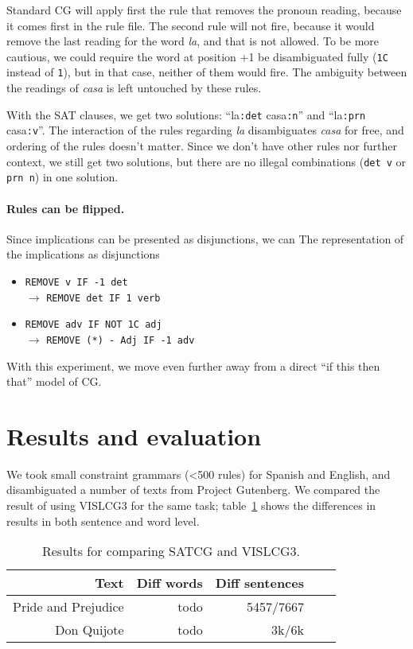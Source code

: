 \documentclass[11pt]{article}
\begin{document}
Standard CG will apply first the rule that removes the pronoun reading, because it comes first in the rule file.
The second rule will not fire, because it would remove the last reading for the word \emph{la}, and that is not allowed. To be more cautious, we could require the word at position +1 be disambiguated fully (\texttt{1C} instead of \texttt{1}), but in that case, neither of them would fire. The ambiguity between the readings of \emph{casa} is left untouched by these rules.

With the SAT clauses, we get two solutions: ``la\texttt{:det} casa\texttt{:n}''  and ``la\texttt{:prn} casa\texttt{:v}''. The interaction of the rules regarding \emph{la}  disambiguates \emph{casa} for free, and ordering of the rules doesn't matter. Since we don't have other rules nor further context, we still get two solutions, but there are no illegal combinations (\texttt{det v} or \texttt{prn n}) in one solution.

\paragraph{Rules can be flipped.}
Since implications can be presented as disjunctions, we can 
The representation of the implications as disjunctions 
\begin{itemize}
\item [] \texttt{REMOVE v IF -1 det} \\ $\rightarrow$ \texttt{REMOVE det IF 1 verb}   
\item [] \texttt{REMOVE adv IF NOT 1C adj} \\ $\rightarrow$ \texttt{REMOVE (*) - Adj  IF -1 adv}  \\
\end{itemize}

With this experiment, we move even further away from a direct ``if this then that'' model of CG.

\section{Results and evaluation}

We took small constraint grammars (<500 rules) for Spanish and English, and disambiguated a number of texts from Project Gutenberg. We compared the result of using VISLCG3 for the same task; table~\ref{table:results} shows the differences in results in both sentence and word level.

\begin{table}
  \centering
  \begin{tabular}{|r|r|r|r|r|}
     \hline
    \textbf{Text} & \textbf{Diff words} & \textbf{Diff sentences} \\
    \hline
	Pride and Prejudice & todo & 5457/7667 \\  
    \hline
       Don Quijote & todo & 3k/6k  \\ 
     \hline
  \end{tabular}
  \caption{Results for comparing SATCG and VISLCG3.}
  \label{table:results}
\end{table}
\end{document}
